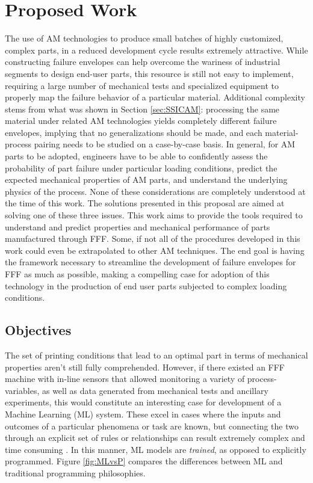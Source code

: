 \documentclass[main.tex]{subfiles}
\begin{document}
\chapter{Proposed Work} \label{ch:proposal}

The use of AM technologies to produce small batches of highly customized, complex parts, in a reduced development cycle results extremely attractive. While constructing failure envelopes can help overcome the wariness of industrial segments to design end-user parts, this resource is still not easy to implement, requiring a large number of mechanical tests and specialized equipment to properly map the failure behavior of a particular material. Additional complexity stems from what was shown in Section \ref{sec:SSICAM}: processing the same material under related AM technologies yields completely different failure envelopes, implying that no generalizations should be made, and each material-process pairing needs to be studied on a case-by-case basis. In general, for AM parts to be adopted, engineers have to be able to confidently assess the probability of part failure under particular loading conditions, predict the expected mechanical properties of AM parts, and understand the underlying physics of the process. None of these considerations are completely understood at the time of this work. The solutions presented in this proposal are aimed at solving one of these three issues. This work aims to provide the tools required to understand and predict properties and mechanical performance of parts manufactured through FFF. Some, if not all of the procedures developed in this work could even be extrapolated to other AM techniques. The end goal is having the framework necessary to streamline the development of failure envelopes for FFF as much as possible, making a compelling case for adoption of this technology in the production of end user parts subjected to complex loading conditions. 

\section{Objectives} \label{sec:objectives}

The set of printing conditions that lead to an optimal part in terms of mechanical properties aren't still fully comprehended. However, if there existed an FFF machine with in-line sensors that allowed monitoring a variety of process-variables, as well as data generated from mechanical tests and ancillary experiments, this would constitute an interesting case for development of a Machine Learning (ML) system. These excel in cases where the inputs and outcomes of a particular phenomena or task are known, but connecting the two through an explicit set of rules or relationships can result extremely complex and time consuming \cite{Chollet2018}. In this manner, ML models are \emph{trained}, as opposed to explicitly programmed. Figure \ref{fig:MLvsP} compares the differences between ML and traditional programming philosophies. 
\end{document}
